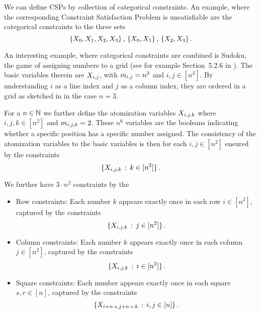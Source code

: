 \begin{remark}
    We can define CSPs by collection of categorical constraints.
    An example, where the corresponding Constraint Satisfaction Problem is unsatisfiable are the categorical constraints to the three sets
    \[ \{X_{0},X_{1},X_{2},X_{3}\} \, , \, \{X_{0},X_{1}\}\, ,\,\{X_{2},X_{3}\} \, . \]
\end{remark}


\begin{example}[Sudoku]
    \label{exa:sudoku}
    An interesting example, where categorical constraints are combined is Sudoku, the game of assigning numbers to a grid (see for example Section~5.2.6 in \cite{russell_artificial_2021}).
    The basic variables therein are $X_{i,j}$, with $m_{i,j}=n^2$ and $i,j\in[n^2]$.
    By understanding $i$ as a line index and $j$ as a column index, they are ordered in a grid as sketched in  in the case $n=3$.

    For a $n\in\mathbb{N}$ we further define the atomization variables $X_{i,j,k}$ where $i,j,k\in[n^2]$ and $m_{i,j,k}=2$.
    These $n^6$ variables are the booleans indicating whether a specific position has a specific number assigned.
    The consistency of the atomization variables to the basic variables is then for each $i,j\in[n^2]$ ensured by the constraints
    \[ \{X_{i,j,k} \, : \, k\in [n^2] \} \, . \]

    We further have $3\cdot n^2$ constraints by the
    \begin{itemize}
        \item Row constraints: Each number $k$ appears exactly once in each row $i\in[n^2]$, captured by the constraints
        \[ \{X_{i,j,k}  \, : \, j \in [n^2] \} \, . \]
        \item Column constraints: Each number $k$ appears exactly once in each column $j\in[n^2]$, captured by the constraints
        \[ \{X_{i,j,k}  \, : \, i \in [n^2] \} \, . \]
        \item Square constraints: Each number appears exactly once in each square $s,r\in[n]$, captured by the constraints
        \[ \{X_{i+n\cdot s,j+n\cdot r,k}  \, : \, i,j \in [n] \} \, . \]
    \end{itemize}


\end{example}
